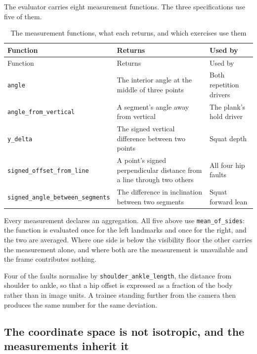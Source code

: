 The evaluator carries eight measurement functions. The three specifications use five of them.

{\small
\setlength{\LTpre}{6pt}\setlength{\LTpost}{8pt}
\begin{longtable}{>{\raggedright\arraybackslash}p{}>{\raggedright\arraybackslash}p{}>{\raggedright\arraybackslash}p{}}
\caption{The measurement functions, what each returns, and which exercises use them}\\
\toprule
Function & Returns & Used by \\
\midrule
\endfirsthead
\toprule
Function & Returns & Used by \\
\midrule
\endhead
\bottomrule
\endfoot
\bottomrule
\endlastfoot
\texttt{angle} & The interior angle at the middle of three points & Both repetition drivers \\
\texttt{angle\_\allowbreak{}from\_\allowbreak{}vertical} & A segment's angle away from vertical & The plank's hold driver \\
\texttt{y\_\allowbreak{}delta} & The signed vertical difference between two points & Squat depth \\
\texttt{signed\_\allowbreak{}offset\_\allowbreak{}from\_\allowbreak{}line} & A point's signed perpendicular distance from a line through two others & All four hip faults \\
\texttt{signed\_\allowbreak{}angle\_\allowbreak{}between\_\allowbreak{}segments} & The difference in inclination between two segments & Squat forward lean \\
\end{longtable}
}

Every measurement declares an aggregation. All five above use \texttt{mean\_\allowbreak{}of\_\allowbreak{}sides}: the function is evaluated once for the left landmarks and once for the right, and the two are averaged. Where one side is below the visibility floor the other carries the measurement alone, and where both are the measurement is unavailable and the frame contributes nothing.

Four of the faults normalise by \texttt{shoulder\_\allowbreak{}ankle\_\allowbreak{}length}, the distance from shoulder to ankle, so that a hip offset is expressed as a fraction of the body rather than in image units. A trainee standing further from the camera then produces the same number for the same deviation.

\subsection{The coordinate space is not isotropic, and the measurements inherit it}
\label{sec:6.2.1}

